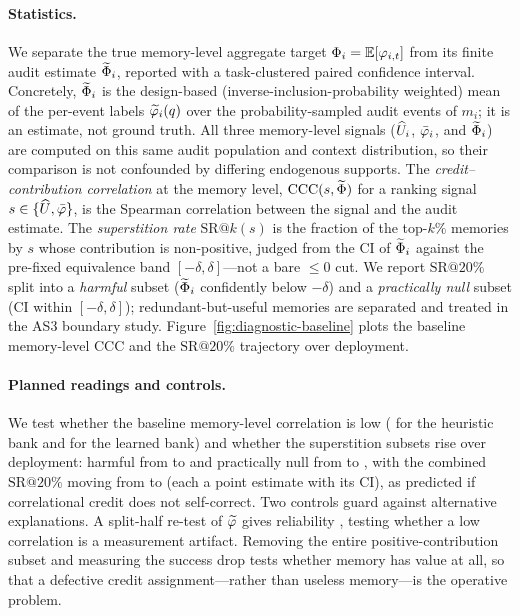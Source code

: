\paragraph{Statistics.}
We separate the true memory-level aggregate target
$\Phi_i = \mathbb{E}[\varphi_{i,t}]$ from its finite \rit{} audit estimate
$\widetilde{\Phi}_i$, reported with a task-clustered paired confidence interval.
Concretely, $\widetilde{\Phi}_i$ is the design-based (inverse-inclusion-probability
weighted) mean of the per-event labels $\widetilde{\varphi}_i(q)$ over the probability-sampled
audit events of $m_i$; it is an estimate, not ground truth. All three memory-level
signals ($\widehat{U}_i$, $\bar{\varphi}_i$, and $\widetilde{\Phi}_i$) are computed on this same
audit population and context distribution, so their comparison is not confounded by
differing endogenous supports. The \emph{credit--contribution
correlation} at the memory level, $\mathrm{CCC}(s, \widetilde{\Phi})$ for a ranking signal
$s \in \{\widehat{U}, \bar{\varphi}\}$, is the Spearman correlation between the signal and the
audit estimate. The \emph{superstition rate} $\mathrm{SR@}k(s)$ is the fraction of
the top-$k\%$ memories by $s$ whose contribution is non-positive, judged from the CI
of $\widetilde{\Phi}_i$ against the pre-fixed equivalence band $[-\delta, \delta]$---not a
bare $\le 0$ cut. We report $\mathrm{SR@}20\%$ split into a \emph{harmful} subset
($\widetilde{\Phi}_i$ confidently below $-\delta$) and a \emph{practically null} subset
(CI within $[-\delta, \delta]$); redundant-but-useful memories are separated and
treated in the AS3 boundary study. Figure~\ref{fig:diagnostic-baseline} plots the
baseline memory-level $\mathrm{CCC}$ and the $\mathrm{SR@}20\%$ trajectory over
deployment.



\paragraph{Planned readings and controls.}
We test whether the baseline memory-level correlation is low
( for the heuristic bank and
 for the learned bank) and whether the superstition
subsets rise over deployment: harmful from  to
 and practically null from 
to , with the combined $\mathrm{SR@}20\%$ moving from
 to  (each a point estimate with its CI),
as predicted if correlational credit does not self-correct. Two controls guard
against alternative explanations. A split-half re-test of $\widetilde{\varphi}$ gives
reliability , testing whether a low correlation
is a measurement artifact. Removing the entire positive-contribution subset and
measuring the success drop  tests whether
memory has value at all, so that a defective credit assignment---rather than
useless memory---is the operative problem.


